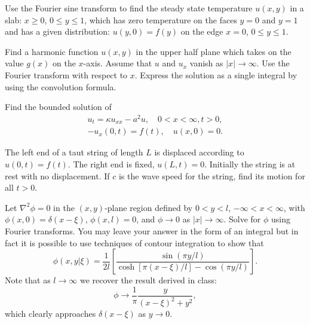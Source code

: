 {%
\begin{Exercise}
  Use the Fourier sine transform to find the steady state temperature
  $u(x,y)$ in a slab: $x \geq 0$,
  $0 \leq y \leq 1$, which has zero temperature on the faces $y = 0$ and
  $y = 1$ and has a given distribution: $u(y,0) = f(y)$ on the
  edge $x = 0$, $0 \leq y \leq 1$.
\end{Exercise}



\begin{Exercise}
  Find a harmonic function $u(x,y)$ in the upper half plane which takes on the
  value $g(x)$ on the $x$-axis.  Assume that $u$ and $u_x$ vanish as
  $|x| \to \infty$.  Use the Fourier transform with respect to $x$.  
  Express the solution as a single integral by using the convolution 
  formula.
\end{Exercise}



\begin{Exercise}
  Find the bounded solution of
  \begin{gather*}
    u_t = \kappa u_{x x} - a^2 u, \quad 0 < x < \infty, t > 0, \\
    -u_x(0,t) = f(t), \quad u(x,0) = 0.
  \end{gather*}
\end{Exercise}





\begin{Exercise}
  The left end of a taut string of length $L$ is displaced according to
  $u(0,t) = f(t)$.  The right end is fixed, $u(L,t) = 0$.  Initially the
  string is at rest with no displacement.  If $c$ is the wave speed for the 
  string, find its motion for all $t > 0$.
\end{Exercise}









\begin{Exercise}
  Let $\nabla^2 \phi = 0$ in the $(x,y)$-plane 
  region defined by $0 < y < l$, $-\infty < x < \infty$, with 
  $\phi(x,0) = \delta(x-\xi)$, $\phi(x,l) = 0$, and $\phi \to 0$ as
  $|x| \to \infty$. Solve for $\phi$ using Fourier transforms. You may
  leave your answer in the form of an integral but in fact it is possible to use
  techniques of contour integration to show that
  \[
  \phi(x,y|\xi) = \frac{1}{2l} \left [ \frac{\sin (\pi y/l)}
    {\cosh[\pi (x-\xi)/l] - \cos(\pi y/l)}\right].
  \]
  Note that as $l \to \infty$ we recover the result derived in 
  class:
  \[
  \phi \to  \frac{1}{\pi} \frac{y}{(x-\xi)^2 + y^2},
  \]
  which clearly approaches $\delta(x-\xi)$ as $y \to 0$.
\end{Exercise}










\raggedbottom
}
